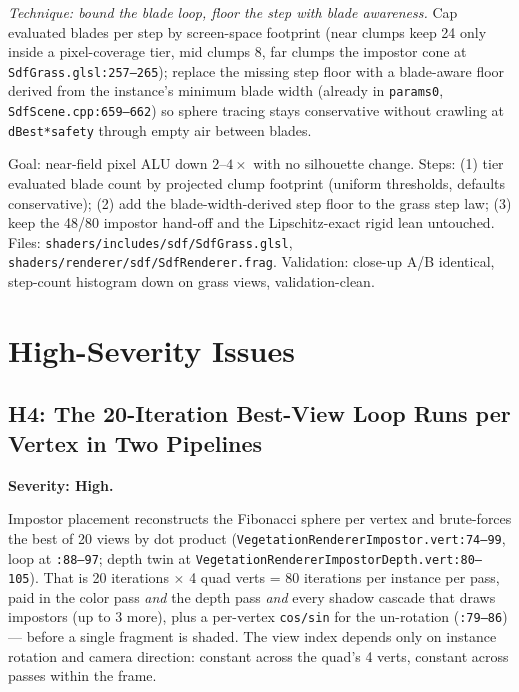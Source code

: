 \documentclass[11pt,a4paper]{article}
\begin{document}
\textit{Technique: bound the blade loop, floor the step with blade
awareness.} Cap evaluated blades per step by screen-space footprint (near
clumps keep 24 only inside a pixel-coverage tier, mid clumps 8, far clumps
the impostor cone at \texttt{SdfGrass.glsl:257--265}); replace the missing
step floor with a blade-aware floor derived from the instance's minimum
blade width (already in \texttt{params0}, \texttt{SdfScene.cpp:659--662})
so sphere tracing stays conservative without crawling at
\texttt{dBest*safety} through empty air between blades.

\begin{tcolorbox}[promptbox={Prompt --- C3: footprint-tiered blade count, blade-aware step floor}]
Goal: near-field pixel ALU down $2$--$4\times$ with no silhouette change.
Steps: (1) tier evaluated blade count by projected clump footprint (uniform
thresholds, defaults conservative); (2) add the blade-width-derived step
floor to the grass step law; (3) keep the 48/80 impostor hand-off and the
Lipschitz-exact rigid lean untouched. Files:
\texttt{shaders/includes/sdf/SdfGrass.glsl},
\texttt{shaders/renderer/sdf/SdfRenderer.frag}. Validation: close-up A/B
identical, step-count histogram down on grass views, validation-clean.
\end{tcolorbox}

\section{High-Severity Issues}

\subsection{H4: The 20-Iteration Best-View Loop Runs per Vertex in Two Pipelines}

\textbf{Severity: High.}

Impostor placement reconstructs the Fibonacci sphere per vertex and
brute-forces the best of 20 views by dot product
(\texttt{VegetationRendererImpostor.vert:74--99}, loop at \texttt{:88--97};
depth twin at \texttt{VegetationRendererImpostorDepth.vert:80--105}). That
is 20 iterations $\times$ 4 quad verts = 80 iterations per instance per pass,
paid in the color pass \emph{and} the depth pass \emph{and} every shadow
cascade that draws impostors (up to 3 more), plus a per-vertex
\texttt{cos/sin} for the un-rotation (\texttt{:79--86}) --- before a single
fragment is shaded. The view index depends only on instance rotation and
camera direction: constant across the quad's 4 verts, constant across
passes within the frame.
\end{document}
